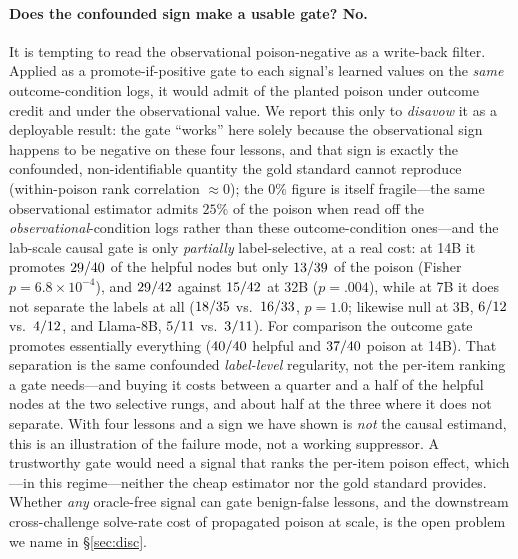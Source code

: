 \paragraph{Does the confounded sign make a usable gate? No.} It is tempting to read the
observational poison-negative as a write-back filter. Applied as a promote-if-positive
gate to each signal's learned values on the \emph{same} outcome-condition logs, it would
admit \PromotePoisonOut{} of the planted poison under outcome credit and
\PromotePoisonObs{} under the observational value. We report this only to \emph{disavow}
it as a deployable result: the gate ``works'' here solely because the observational sign
happens to be negative on these four lessons, and that sign is exactly the confounded,
non-identifiable quantity the gold standard cannot reproduce (within-poison rank
correlation $\approx0$); the $0\%$ figure is itself fragile---the same observational
estimator admits $25\%$ of the poison when read off the \emph{observational}-condition logs
rather than these outcome-condition ones---and the lab-scale causal gate is only
\emph{partially} label-selective, at a real cost: at 14B it promotes
$29/40{}$ of the helpful nodes but only
$13/39{}$ of the poison (Fisher $p{=}6.8{\times}10^{-4}$), and
$29/42{}$ against $15/42{}$ at 32B
($p{=}.004$), while at 7B it does not separate the labels at all
($18/35{}$ vs.\ $16/33{}$, $p{=}1.0$; likewise null
at 3B, $6/12{}$ vs.\ $4/12{}$, and Llama-8B,
$5/11{}$ vs.\ $3/11{}$). For comparison the
outcome gate promotes essentially everything ($40/40{}$ helpful and
$37/40{}$ poison at 14B). That separation is the same confounded
\emph{label-level} regularity, not the per-item ranking a gate needs---and buying it
costs between a quarter and a half of the helpful nodes at the two selective rungs, and
about half at the three where it does not separate. With four lessons and a
sign we have shown is \emph{not} the causal estimand, this is an illustration of the
failure mode, not a working suppressor. A trustworthy gate would need a signal that ranks
the per-item poison effect, which---in this regime---neither the cheap estimator nor the
gold standard provides. Whether \emph{any} oracle-free signal can gate benign-false lessons, and the
downstream cross-challenge solve-rate cost of propagated poison at scale, is the open
problem we name in \S\ref{sec:disc}.
